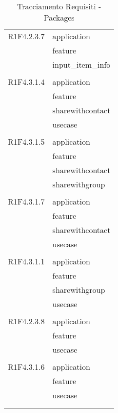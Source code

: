 \begin{center}
\begin{longtable}{|p{7cm}|p{7cm}|}
		R1F4.2.3.7 & application \\ & feature \\ & input\_item\_info \\ & \\ \hline
		R1F4.3.1.4 & application \\ & feature \\ & sharewithcontact \\ & usecase \\ & \\ \hline
		R1F4.3.1.5 & application \\ & feature \\ & sharewithcontact \\ & sharewithgroup \\ & \\ \hline
		R1F4.3.1.7 & application \\ & feature \\ & sharewithcontact \\ & usecase \\ & \\ \hline
		R1F4.3.1.1 & application \\ & feature \\ & sharewithgroup \\ & usecase \\ & \\ \hline
		R1F4.2.3.8 & application \\ & feature \\ & usecase \\ & \\ \hline
		R1F4.3.1.6 & application \\ & feature \\ & usecase \\ & \\ \hline
	\caption[Tracciamento Requisiti - Packages]{Tracciamento Requisiti - Packages}
	\label{tabella: Tracciamento Requisiti - Packages}
	\end{longtable}
\end{center}
